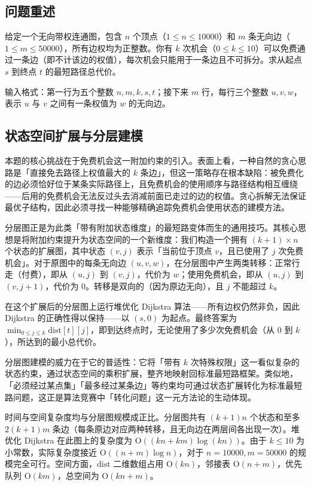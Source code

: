 \documentclass[12pt, a4paper]{academics}
\begin{document}
\subsection{问题重述}

给定一个无向带权连通图，包含 $n$ 个顶点（$1 \le n \le 10000$）和 $m$ 条无向边（$1 \le m \le 50000$），所有边权均为正整数。你有 $k$ 次机会（$0 \le k \le 10$）可以免费通过一条边（即不计该边的权值），每次机会只能用于一条边且不可拆分。求从起点 $s$ 到终点 $t$ 的最短路径总代价。

输入格式：第一行为五个整数 $n, m, k, s, t$；接下来 $m$ 行，每行三个整数 $u, v, w$，表示 $u$ 与 $v$ 之间有一条权值为 $w$ 的无向边。

\subsection{状态空间扩展与分层建模}

本题的核心挑战在于免费机会这一附加约束的引入。表面上看，一种自然的贪心思路是「直接免去路径上权值最大的 $k$ 条边」，但这一策略存在根本缺陷：被免费化的边必须恰好位于某条实际路径上，且免费机会的使用顺序与路径结构相互缠绕——后用的免费机会无法反过头去消减前面已走过的边的权值。贪心拆解无法保证最优子结构，因此必须寻找一种能够精确追踪免费机会使用状态的建模方法。

分层图正是为此类「带有附加状态维度」的最短路变体而生的通用技巧。其核心思想是将附加约束提升为状态空间的一个新维度：我们构造一个拥有 $(k+1) \times n$ 个状态的扩展图，其中状态 $(v, j)$ 表示「当前位于顶点 $v$，且已使用了 $j$ 次免费机会」。对于原图中的每条无向边 $(u, v, w)$，在分层图中产生两类转移：正常行走（付费），即从 $(u, j)$ 到 $(v, j)$，代价为 $w$；使用免费机会，即从 $(u, j)$ 到 $(v, j+1)$，代价为 $0$。转移是双向的（因为原边无向），且 $j$ 不能超过 $k$。

在这个扩展后的分层图上运行堆优化 Dijkstra 算法——所有边权仍然非负，因此 Dijkstra 的正确性得以保持——以 $(s, 0)$ 为起点。最终答案为 $\min_{0 \le j \le k} \mathrm{dist}[t][j]$，即到达终点时，无论使用了多少次免费机会（从 $0$ 到 $k$），所达到的最小总代价。

分层图建模的威力在于它的普适性：它将「带有 $k$ 次特殊权限」这一看似复杂的状态约束，通过状态空间的乘积扩展，整齐地映射回标准最短路框架。类似地，「必须经过某点集」「最多经过某条边」等约束均可通过状态扩展转化为标准最短路问题，这正是算法竞赛中「转化问题」这一元方法论的生动体现。

时间与空间复杂度均与分层图规模成正比。分层图共有 $(k+1)n$ 个状态和至多 $2(k+1)m$ 条边（每条原边对应两种转移，且无向边在两层间各出现一次）。堆优化 Dijkstra 在此图上的复杂度为 $\mathrm{O}((kn + km) \log (kn))$。由于 $k \le 10$ 为小常数，实际复杂度接近 $\mathrm{O}((n+m) \log n)$，对于 $n = 10000, m = 50000$ 的规模完全可行。空间方面，$\mathrm{dist}$ 二维数组占用 $\mathrm{O}(kn)$，邻接表 $\mathrm{O}(n+m)$，优先队列 $\mathrm{O}(km)$，总空间为 $\mathrm{O}(kn + m)$。
\end{document}
